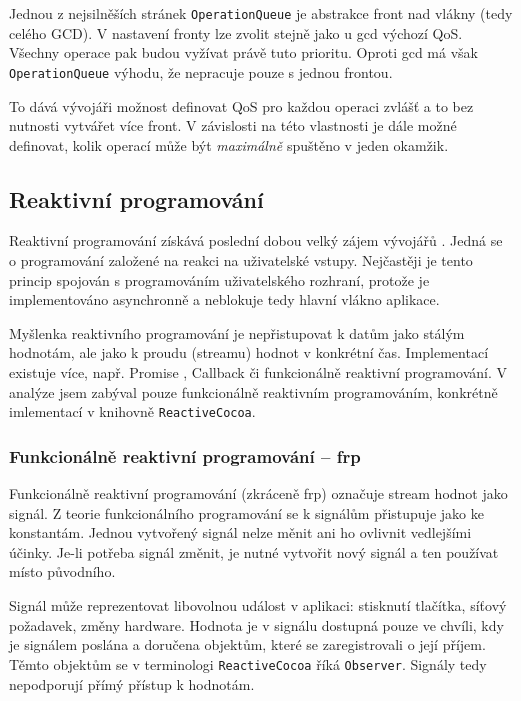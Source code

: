 Jednou z nejsilněších stránek \texttt{OperationQueue} je abstrakce front nad vlákny (tedy celého GCD).
V nastavení fronty lze zvolit stejně jako u \acrshort{gcd} výchozí QoS.
Všechny operace pak budou vyžívat právě tuto prioritu.
Oproti \acrshort{gcd} má však \texttt{OperationQueue} výhodu, že nepracuje pouze s jednou frontou.

To dává vývojáři možnost definovat QoS pro každou operaci zvlášť a to bez nutnosti vytvářet více front.
V závislosti na této vlastnosti je dále možné definovat, kolik operací může být \textit{maximálně} spuštěno v jeden okamžik.

\subsection{Reaktivní programování}\label{vlakna-rac}

Reaktivní programování získává poslední dobou velký zájem vývojářů \cite{oneagency-rx}.
Jedná se o programování založené na reakci na uživatelské vstupy.
Nejčastěji je tento princip spojován s programováním uživatelského rozhraní, protože je implementováno asynchronně a neblokuje tedy hlavní vlákno aplikace.

Myšlenka reaktivního programování je nepřistupovat k datům jako stálým hodnotám, ale jako k proudu (streamu) hodnot v konkrétní čas.
Implementací existuje více, např. Promise \cite{slaks-promise}, Callback \cite{yld-callback} či funkcionálně reaktivní programování.
V analýze jsem zabýval pouze funkcionálně reaktivním programováním, konkrétně imlementací v knihovně \texttt{ReactiveCocoa}.

\subsubsection*{Funkcionálně reaktivní programování -- \acrshort{frp}}

Funkcionálně reaktivní programování (zkráceně \acrshort{frp}) označuje stream hodnot jako signál.
Z teorie funkcionálního programování se k signálům přistupuje jako ke konstantám.
Jednou vytvořený signál nelze měnit ani ho ovlivnit vedlejšími účinky.
Je-li potřeba signál změnit, je nutné vytvořit nový signál a ten používat místo původního.

Signál může reprezentovat libovolnou událost v aplikaci: stisknutí tlačítka, síťový požadavek, změny hardware.
Hodnota je v signálu dostupná pouze ve chvíli, kdy je signálem poslána a doručena objektům, které se zaregistrovali o její příjem.
Těmto objektům se v terminologi \texttt{ReactiveCocoa} říká \texttt{Observer}.
Signály tedy nepodporují přímý přístup k hodnotám.

